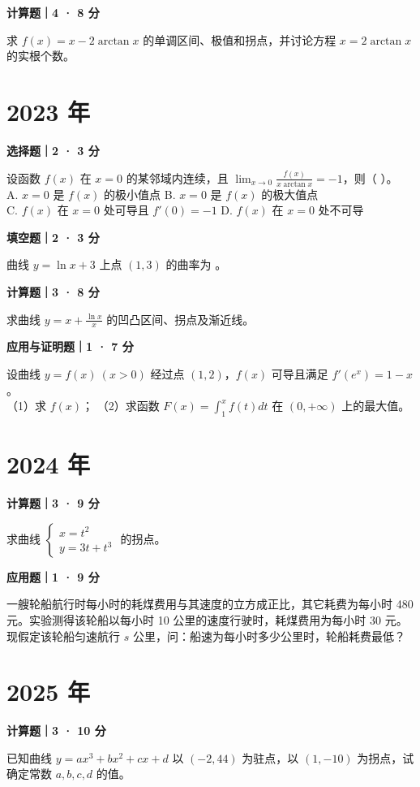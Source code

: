 \textbf{计算题｜4 · 8 分}

求 $f(x) = x - 2\arctan x$ 的单调区间、极值和拐点，并讨论方程 $x = 2\arctan x$ 的实根个数。


\section*{2023 年}


\textbf{选择题｜2 · 3 分}

设函数 $f(x)$ 在 $x = 0$ 的某邻域内连续，且 $\lim_{x \to 0} \frac{f(x)}{x \arctan x} = -1$，则（ \quad ）。\\
A. $x = 0$ 是 $f(x)$ 的极小值点 \quad B. $x = 0$ 是 $f(x)$ 的极大值点\\
C. $f(x)$ 在 $x = 0$ 处可导且 $f'(0) = -1$ \quad D. $f(x)$ 在 $x = 0$ 处不可导


\textbf{填空题｜2 · 3 分}

曲线 $y = \ln x + 3$ 上点 $(1, 3)$ 的曲率为 \underline{\hspace{3cm}}。


\textbf{计算题｜3 · 8 分}

求曲线 $y = x + \frac{\ln x}{x}$ 的凹凸区间、拐点及渐近线。


\textbf{应用与证明题｜1 · 7 分}

设曲线 $y = f(x) \ (x > 0)$ 经过点 $(1, 2)$，$f(x)$ 可导且满足 $f'(e^x) = 1 - x$。\\
（1）求 $f(x)$； \quad （2）求函数 $F(x) = \int_1^x f(t) dt$ 在 $(0, +\infty)$ 上的最大值。


\section*{2024 年}


\textbf{计算题｜3 · 9 分}

求曲线 $\begin{cases} x = t^2 \\ y = 3t + t^3 \end{cases}$ 的拐点。


\textbf{应用题｜1 · 9 分}

一艘轮船航行时每小时的耗煤费用与其速度的立方成正比，其它耗费为每小时 480 元。实验测得该轮船以每小时 10 公里的速度行驶时，耗煤费用为每小时 30 元。现假定该轮船匀速航行 $s$ 公里，问：船速为每小时多少公里时，轮船耗费最低？


\section*{2025 年}


\textbf{计算题｜3 · 10 分}

已知曲线 $y = ax^3 + bx^2 + cx + d$ 以 $(-2, 44)$ 为驻点，以 $(1, -10)$ 为拐点，试确定常数 $a, b, c, d$ 的值。
